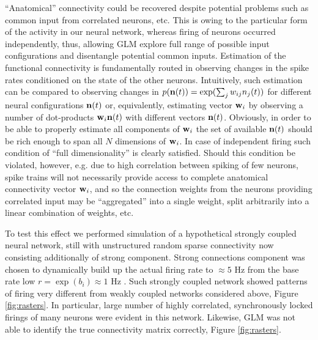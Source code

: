 ``Anatomical'' connectivity could be recovered despite potential problems such as common input from correlated neurons, etc. This is owing to the particular form of the activity in our neural network, whereas firing of neurons occurred independently, thus, allowing GLM explore full range of possible input configurations and disentangle potential common inputs.  Estimation of the functional connectivity is fundamentally routed in observing changes in the spike rates conditioned on the state of the other neurons. Intuitively, such estimation can be compared to observing changes in $p({\bf n}(t))=\exp(\sum_j w_{ij}n_j(t))$ for different neural configurations ${\bf n}(t)$ or, equivalently, estimating vector ${\bf w}_i$ by observing a number of dot-products ${\bf w}_i {\bf n}(t)$ with different vectors ${\bf n}(t)$. Obviously, in order to be able to properly estimate all components of ${\bf w}_i$ the set of available ${\bf n}(t)$ should be rich enough to span all $N$ dimensions of ${\bf w}_i$. In case of independent firing such condition of ``full dimensionality'' is clearly satisfied.  Should this condition be violated, however, e.g. due to high correlation between spiking of few neurons, spike trains will not necessarily provide access to complete anatomical connectivity vector ${\bf w}_i$, and so the connection weights from the neurons providing correlated input may be ``aggregated'' into a single weight, split arbitrarily into a linear combination of weights, etc.

To test this effect we performed simulation of a hypothetical strongly coupled  neural network, still with unstructured random sparse connectivity now consisting additionally of strong component. Strong connections component was chosen to dynamically build up the actual firing rate to $\approx 5$  Hz from the base rate low $r=\exp(b_i)\approx 1$ Hz . Such strongly coupled network showed patterns of firing very different from weakly coupled networks considered above, Figure \ref{fig:rasters}.  In particular, large number of highly correlated, synchronously locked firings of many neurons were evident in this network.  Likewise, GLM was not able to identify the true connectivity matrix correctly, Figure \ref{fig:rasters}. 

